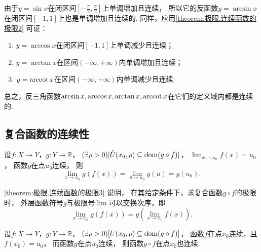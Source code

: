 \begin{example}
由于\(y=\sin x\)在闭区间\(\left[-\frac{\pi}{2},\frac{\pi}{2}\right]\)上单调增加且连续，
所以它的反函数\(y=\arcsin x\)在闭区间\([-1,1]\)上也是单调增加且连续的.
同样，应用\cref{theorem:极限.连续函数的极限2} 可证：
\begin{enumerate}
	\item \(y=\arccos x\)在闭区间\([-1,1]\)上单调减少且连续；
	\item \(y=\arctan x\)在区间\((-\infty,+\infty)\)内单调增加且连续；
	\item \(y=\arccot x\)在区间\((-\infty,+\infty)\)内单调减少且连续.
\end{enumerate}
总之，反三角函数\(\arcsin x,\arccos x,\arctan x,\arccot x\)在它们的定义域内都是连续的.
\end{example}

\subsection{复合函数的连续性}
\begin{theorem}\label{theorem:极限.连续函数的极限3}
设\(f\colon X\to Y\)，\(g\colon Y\to\mathbb{R}\)，
\((\exists\rho>0)[\mathring{U}(x_0,\rho) \subseteq \operatorname{dom}(g \circ f)]\)，
\(\lim_{x \to x_0} f(x) = u_0\)，
函数\(g\)在点\(u_0\)连续，
则\[
	\lim_{x \to x_0} g(f(x)) = \lim_{u \to u_0} g(u) = g(u_0).
\]
\end{theorem}

\cref{theorem:极限.连续函数的极限3} 说明，
在其给定条件下，求复合函数\(g \circ f\)的极限时，
外层函数符号\(g\)与极限号\(\lim\)可以交换次序，即\[
	\lim_{x \to x_0} g(f(x))
	= g\left(\lim_{x \to x_0} f(x)\right).
\]

\begin{theorem}\label{theorem:极限.连续函数的极限4}
设\(f\colon X\to Y\)，\(g\colon Y\to\mathbb{R}\)，
\((\exists\rho>0)[U(x_0,\rho) \subseteq \operatorname{dom}(g \circ f)]\)，
函数\(f\)在点\(x_0\)连续，且\(f(x_0) = u_0\)，
而函数\(g\)在点\(u_0\)连续，
则函数\(g \circ f\)在点\(x_0\)也连续.
\end{theorem}

